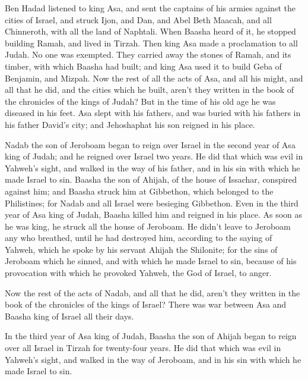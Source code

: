  Ben Hadad listened to king Asa, and sent the captains of
his armies against the cities of Israel, and struck Ijon, and Dan, and
Abel Beth Maacah, and all Chinneroth, with all the land of Naphtali.
 When Baasha heard of it, he stopped building Ramah, and
lived in Tirzah.  Then king Asa made a proclamation to all
Judah. No one was exempted. They carried away the stones of Ramah, and
its timber, with which Baasha had built; and king Asa used it to build
Geba of Benjamin, and Mizpah.  Now the rest of all the acts
of Asa, and all his might, and all that he did, and the cities which he
built, aren't they written in the book of the chronicles of the kings of
Judah? But in the time of his old age he was diseased in his feet.
 Asa slept with his fathers, and was buried with his
fathers in his father David's city; and Jehoshaphat his son reigned in
his place.

 Nadab the son of Jeroboam began to reign over Israel in
the second year of Asa king of Judah; and he reigned over Israel two
years.  He did that which was evil in Yahweh's sight, and
walked in the way of his father, and in his sin with which he made
Israel to sin.  Baasha the son of Ahijah, of the house of
Issachar, conspired against him; and Baasha struck him at Gibbethon,
which belonged to the Philistines; for Nadab and all Israel were
besieging Gibbethon.  Even in the third year of Asa king of
Judah, Baasha killed him and reigned in his place.  As soon
as he was king, he struck all the house of Jeroboam. He didn't leave to
Jeroboam any who breathed, until he had destroyed him, according to the
saying of Yahweh, which he spoke by his servant Ahijah the Shilonite;
 for the sins of Jeroboam which he sinned, and with which
he made Israel to sin, because of his provocation with which he provoked
Yahweh, the God of Israel, to anger.

 Now the rest of the acts of Nadab, and all that he did,
aren't they written in the book of the chronicles of the kings of
Israel?  There was war between Asa and Baasha king of
Israel all their days.

 In the third year of Asa king of Judah, Baasha the son of
Ahijah began to reign over all Israel in Tirzah for twenty-four years.
 He did that which was evil in Yahweh's sight, and walked
in the way of Jeroboam, and in his sin with which he made Israel to sin.

